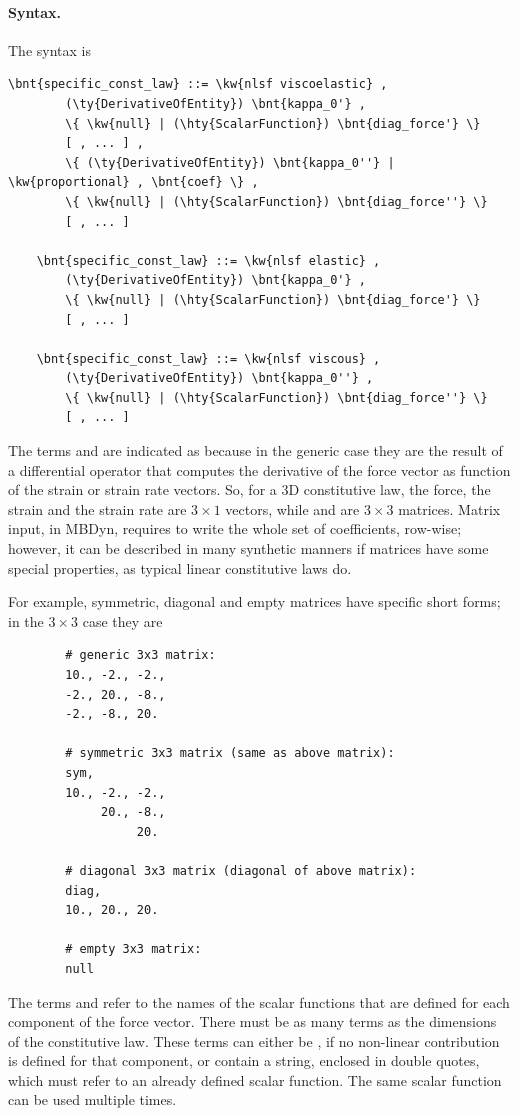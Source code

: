 \paragraph{Syntax.}
\label{sec:CL:nlsf-syntax}
The syntax is
\begin{Verbatim}[commandchars=\\\{\}]
    \bnt{specific_const_law} ::= \kw{nlsf viscoelastic} ,
        (\ty{DerivativeOfEntity}) \bnt{kappa_0'} ,
        \{ \kw{null} | (\hty{ScalarFunction}) \bnt{diag_force'} \}
        [ , ... ] ,
        \{ (\ty{DerivativeOfEntity}) \bnt{kappa_0''} | \kw{proportional} , \bnt{coef} \} ,
        \{ \kw{null} | (\hty{ScalarFunction}) \bnt{diag_force''} \}
        [ , ... ]

    \bnt{specific_const_law} ::= \kw{nlsf elastic} ,
        (\ty{DerivativeOfEntity}) \bnt{kappa_0'} ,
        \{ \kw{null} | (\hty{ScalarFunction}) \bnt{diag_force'} \}
        [ , ... ]

    \bnt{specific_const_law} ::= \kw{nlsf viscous} ,
        (\ty{DerivativeOfEntity}) \bnt{kappa_0''} ,
        \{ \kw{null} | (\hty{ScalarFunction}) \bnt{diag_force''} \}
        [ , ... ]
\end{Verbatim}
The terms  and  are indicated as
 because in the generic case they are the result
of a differential operator that computes the derivative of the force vector
as function of the strain or strain rate vectors.
So, for a 3D constitutive law, the force, the strain and the strain rate
are $3\times 1$ vectors, while  and 
are $3\times 3$ matrices.
Matrix input, in MBDyn, requires to write the whole set of coefficients,
row-wise; however, it can be described in many synthetic manners if
matrices have some special properties, as typical linear constitutive laws do.

For example, symmetric, diagonal and empty matrices have specific
short forms; in the $3\times 3$ case they are
\begin{verbatim}
        # generic 3x3 matrix:
        10., -2., -2.,
        -2., 20., -8.,
        -2., -8., 20.

        # symmetric 3x3 matrix (same as above matrix):
        sym,
        10., -2., -2.,
             20., -8.,
                  20.

        # diagonal 3x3 matrix (diagonal of above matrix):
        diag,
        10., 20., 20.

        # empty 3x3 matrix:
        null
\end{verbatim}
The terms  and  refer
to the names of the scalar functions that are defined for each component
of the force vector.
There must be as many terms as the dimensions of the constitutive law.
These terms can either be , if no non-linear contribution
is defined for that component, or contain a string, enclosed in double quotes,
which must refer to an already defined scalar function.
The same scalar function can be used multiple times.


